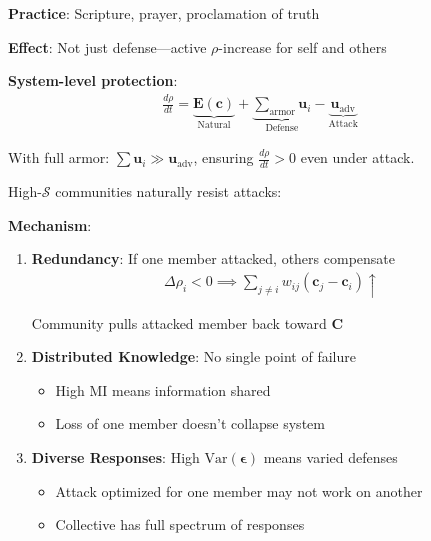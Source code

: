 \documentclass[11pt,a4paper]{article}
\theoremstyle{definition}
\theoremstyle{remark}
\newcommand{\EE}{\mathbf{E}}
\newcommand{\cc}{\mathbf{c}}
\begin{document}
\begin{enumerate}
\begin{protocol}
\begin{enumerate}
        \textbf{Practice}: Scripture, prayer, proclamation of truth
        
        \textbf{Effect}: Not just defense—active \(\rho\)-increase for self and others
\end{enumerate}

\textbf{System-level protection}:
\begin{align}
\frac{d\rho}{dt} = \underbrace{\EE(\cc)}_{\text{Natural}} + \underbrace{\sum_{\text{armor}} \mathbf{u}_i}_{\text{Defense}} - \underbrace{\mathbf{u}_{\text{adv}}}_{\text{Attack}}
\end{align}

With full armor: \(\sum \mathbf{u}_i \gg \mathbf{u}_{\text{adv}}\), ensuring \(\frac{d\rho}{dt} > 0\) even under attack.
\end{protocol}

\begin{protocol}
High-\(\mathcal{S}\) communities naturally resist attacks:

\textbf{Mechanism}:
\begin{enumerate}
    \item \textbf{Redundancy}: If one member attacked, others compensate
        \begin{align}
        \Delta\rho_i < 0 \implies \sum_{j \neq i} w_{ij}(\cc_j - \cc_i) \uparrow
        \end{align}
        
        Community pulls attacked member back toward \(\mathbf{C}\)
    
    \item \textbf{Distributed Knowledge}: No single point of failure
        \begin{itemize}
            \item High \(\text{MI}\) means information shared
            \item Loss of one member doesn't collapse system
        \end{itemize}
    
    \item \textbf{Diverse Responses}: High \(\text{Var}(\boldsymbol{\epsilon})\) means varied defenses
        \begin{itemize}
            \item Attack optimized for one member may not work on another
            \item Collective has full spectrum of responses
        \end{itemize}
    

\end{enumerate}
\end{protocol}
\end{enumerate}
\end{document}
